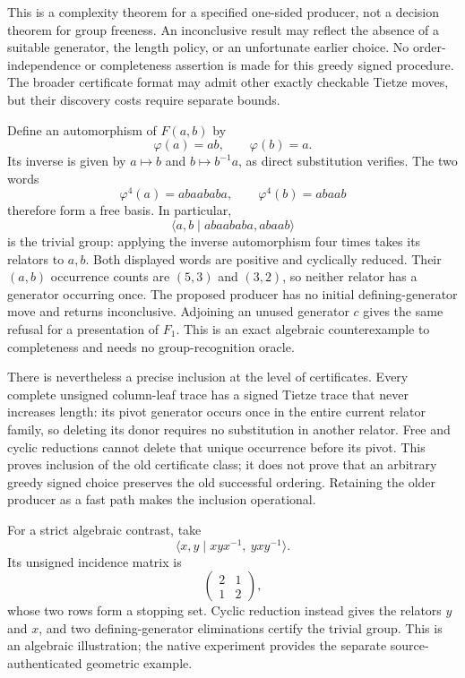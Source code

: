 This is a complexity theorem for a specified one-sided producer, not a
decision theorem for group freeness.  An inconclusive result may reflect
the absence of a suitable generator, the length policy, or an
unfortunate earlier choice.  No order-independence or completeness
assertion is made for this greedy signed procedure.  The broader
certificate format may admit other exactly checkable Tietze moves, but
their discovery costs require separate bounds.

\begin{example}
Define an automorphism of $F(a,b)$ by
\[
 \varphi(a)=ab,\qquad\varphi(b)=a.
\]
Its inverse is given by $a\mapsto b$ and $b\mapsto b^{-1}a$, as direct
substitution verifies.  The two words
\[
 \varphi^4(a)=abaababa,\qquad\varphi^4(b)=abaab
\]
therefore form a free basis.  In particular,
\[
 \langle a,b\mid abaababa,abaab\rangle
\]
is the trivial group: applying the inverse automorphism four times takes
its relators to $a,b$.  Both displayed words are positive and cyclically
reduced.  Their $(a,b)$ occurrence counts are $(5,3)$ and $(3,2)$, so
neither relator has a generator occurring once.  The proposed producer
has no initial defining-generator move and returns inconclusive.
Adjoining an unused generator $c$ gives the same refusal for a
presentation of $F_1$.  This is an exact algebraic counterexample to
completeness and needs no group-recognition oracle.
\end{example}

There is nevertheless a precise inclusion at the level of certificates.
Every complete unsigned column-leaf trace has a signed Tietze trace that
never increases length: its pivot generator occurs once in the entire
current relator family, so deleting its donor requires no substitution
in another relator.  Free and cyclic reductions cannot delete that unique
occurrence before its pivot.  This proves inclusion of the old
certificate class; it does not prove that an arbitrary greedy signed
choice preserves the old successful ordering.  Retaining the older
producer as a fast path makes the inclusion operational.

For a strict algebraic contrast, take
\[
 \langle x,y\mid xyx^{-1},\ yxy^{-1}\rangle.
\]
Its unsigned incidence matrix is
\[
 \begin{pmatrix}2&1\\1&2\end{pmatrix},
\]
whose two rows form a stopping set.  Cyclic reduction instead gives the
relators $y$ and $x$, and two defining-generator eliminations certify the
trivial group.  This is an algebraic illustration; the native experiment
provides the separate source-authenticated geometric example.

